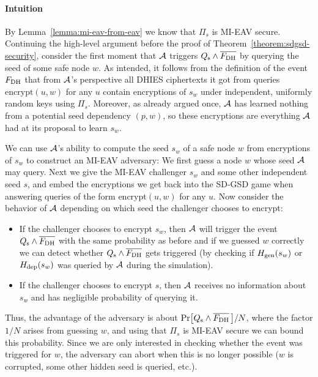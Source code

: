\paragraph{Intuition} By Lemma~\vref{lemma:mi-eav-from-eav} we know that $\Pi_s$ is MI-EAV secure. Continuing the high-level argument before the proof of Theorem~\ref{theorem:sdgsd-security}, consider the first moment that $\mathcal{A}$ triggers $Q_\mathrm{s} \land \overline{F_\mathrm{DH}}$ by querying the seed of some safe node $w$.  As intended, it follows from the definition of the event $F_\mathrm{DH}$ that from $\mathcal{A}$'s perspective all DHIES ciphertexts it got from queries $\mathrm{encrypt}(u, w)$ for any $u$ contain encryptions of $s_w$ under independent, uniformly random keys using $\Pi_s$. Moreover, as already argued once, $\mathcal{A}$ has learned nothing from a potential seed dependency $(p, w)$, so these encryptions are everything $\mathcal{A}$ had at its proposal to learn $s_w$.


We can use $\mathcal{A}$'s ability to compute the seed $s_w$ of a safe node $w$ from encryptions of $s_w$ to construct an MI-EAV adversary: We first guess a node $w$ whose seed $\mathcal{A}$ may query. Next we give the MI-EAV challenger $s_w$ and some other independent seed $s$, and embed the encryptions we get back into the SD-GSD game when answering queries of the form $\mathrm{encrypt}(u, w)$ for any $u$. Now consider the behavior of $\mathcal{A}$ depending on which seed the challenger chooses to encrypt:
\begin{itemize}
	\item If the challenger chooses to encrypt $s_w$, then $\mathcal{A}$ will trigger the event $Q_\mathrm{s} \land \overline{F_\mathrm{DH}}$ with the same probability as before and if we guessed $w$ correctly we can detect whether $Q_\mathrm{s} \land \overline{F_\mathrm{DH}}$ gets triggered (by checking if $H_\mathrm{gen}(s_w)$ or $H_\mathrm{dep}(s_w)$ was queried by $\mathcal{A}$ during the simulation).
	\item If the challenger chooses to encrypt $s$, then $\mathcal{A}$ receives no information about $s_w$ and has negligible probability of querying it.
\end{itemize}
Thus, the advantage of the adversary is about $\pr{\qs \land \overline{\fdh}\,}/N$, where the factor $1/N$ arises from guessing $w$, and using that $\Pi_s$ is MI-EAV secure we can bound this probability. Since we are only interested in checking whether the event was triggered for $w$, the adversary can abort when this is no longer possible ($w$ is corrupted, some other hidden seed is queried, etc.).

